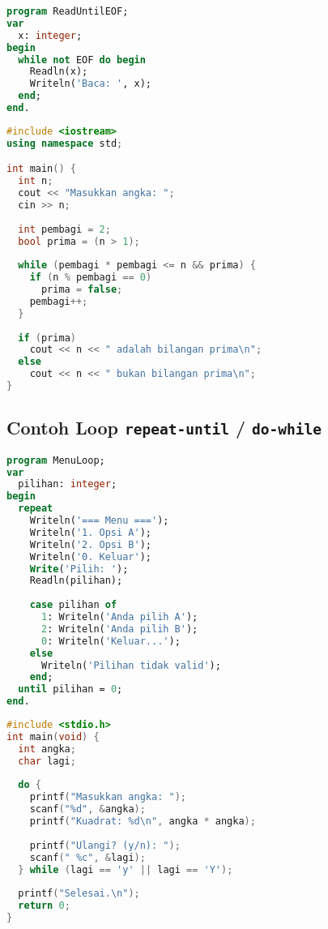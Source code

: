 \documentclass[../main.tex]{subfiles}
\begin{document}
\begin{lstlisting}[language=Pascal, caption={Baca hingga EOF (Pascal)}]
program ReadUntilEOF;
var
  x: integer;
begin
  while not EOF do begin
    Readln(x);
    Writeln('Baca: ', x);
  end;
end.
\end{lstlisting}

\begin{lstlisting}[language=C++, caption={Hitung bilangan prima dengan while (C++)}]
#include <iostream>
using namespace std;

int main() {
  int n;
  cout << "Masukkan angka: ";
  cin >> n;
  
  int pembagi = 2;
  bool prima = (n > 1);
  
  while (pembagi * pembagi <= n && prima) {
    if (n % pembagi == 0)
      prima = false;
    pembagi++;
  }
  
  if (prima)
    cout << n << " adalah bilangan prima\n";
  else
    cout << n << " bukan bilangan prima\n";
}
\end{lstlisting}

\subsection{Contoh Loop \texttt{repeat-until} / \texttt{do-while}}
\begin{lstlisting}[language=Pascal, caption={Menu dengan repeat-until (Pascal)}]
program MenuLoop;
var
  pilihan: integer;
begin
  repeat
    Writeln('=== Menu ===');
    Writeln('1. Opsi A');
    Writeln('2. Opsi B');
    Writeln('0. Keluar');
    Write('Pilih: ');
    Readln(pilihan);
    
    case pilihan of
      1: Writeln('Anda pilih A');
      2: Writeln('Anda pilih B');
      0: Writeln('Keluar...');
    else
      Writeln('Pilihan tidak valid');
    end;
  until pilihan = 0;
end.
\end{lstlisting}

\begin{lstlisting}[language=C, caption={Input ulang dengan do-while (C)}]
#include <stdio.h>
int main(void) {
  int angka;
  char lagi;
  
  do {
    printf("Masukkan angka: ");
    scanf("%d", &angka);
    printf("Kuadrat: %d\n", angka * angka);
    
    printf("Ulangi? (y/n): ");
    scanf(" %c", &lagi);
  } while (lagi == 'y' || lagi == 'Y');
  
  printf("Selesai.\n");
  return 0;
}
\end{lstlisting}
\end{document}
